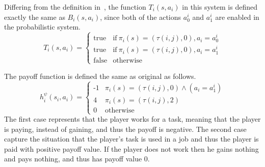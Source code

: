 Differing from the definition in~\cite{MMS08}, the function $T_i(s,a_i)$ in this system is defined exactly the same as $B_i(s,a_i)$, since both of the actions $a^i_0$ and $a^i_1$ are enabled in the probabilistic system.
\begin{equation*}
T_i(s,a_i)=
\begin{cases}
\mbox{true} &\mbox{if}\ \pi_i(s)=(\tau(i,j),0), a_i=a^i_0\\
\mbox{true} & \mbox{if}\ \pi_i(s)=(\tau(i,j),0), a_i=a^i_1\\
\mbox{false} & \mbox{otherwise} 
\end{cases}
\end{equation*}

The payoff function is defined the same as original as follows.
\begin{equation*}
\text{$h^{\psi}_i(s_i,a_i)=$}
\begin{cases}
\text{-1} &  \text{$\pi_i(s)=(\tau(i,j),0) \wedge (a_i = a^i_1) $} \\
\text{4} & \text{$\pi_i(s)=(\tau(i,j),2)$} \\
\text{0} & \text{otherwise}
\end{cases}	
\end{equation*}
The first case represents that the player works for a task, meaning that the player is paying, instead of gaining, and thus the payoff is negative. 
The second case capture the situation that the player's task is used in a job and thus the player is paid with positive payoff value. If the player does not work then he gains nothing and pays nothing, and thus has payoff value $0$. 

